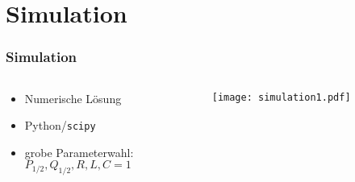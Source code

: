 \section{Simulation}

\begin{frame}
\frametitle{Simulation}
\begin{columns}
  \begin{column}{0.45\textwidth}
    \begin{itemize}
      \item Numerische Lösung\\
      \item Python/\texttt{scipy}
      \item grobe Parameterwahl:\\
      {$P_{1/2}, Q_{1/2}, R, L, C = 1$}
    \end{itemize}
  \end{column}
  \begin{column}{0.55\textwidth}
    \begin{center}
      \centering
      \texttt{[image: simulation1.pdf]}\\
    \end{center}
  \end{column}
\end{columns}


\end{frame}
